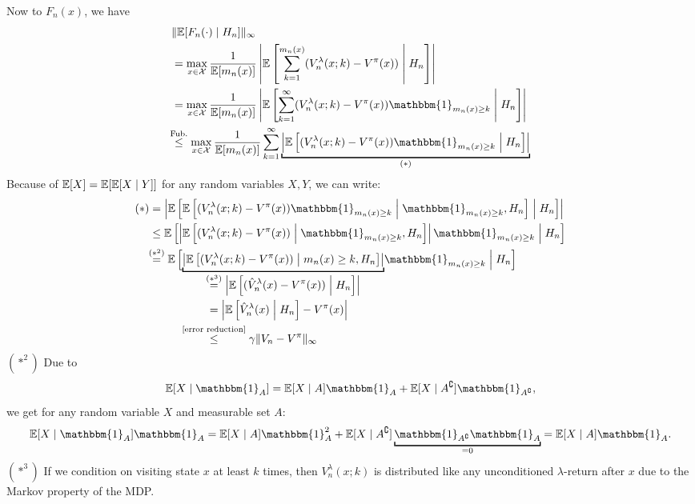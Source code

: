 Now to \(F_n(x)\), we have
\begin{align*}
    &\|\E[F_n(\cdot)\mid H_n]\|_\infty\\
    &= \max_{x\in\cX}\frac{1}{\E[m_n(x)]}
    \left| \E\left[\sum_{k=1}^{m_n(x)}(V_n^\lambda(x;k)-V^\pi(x)) \;\middle|\; H_n \right]\right| \\
    &= \max_{x\in\cX}\frac{1}{\E[m_n(x)]}
    \left| \E\left[\sum_{k=1}^\infty (V_n^\lambda(x;k)-V^\pi(x))\mathbbm{1}_{m_n(x)\ge k} \;\middle|\; H_n \right]\right|\\
    &\lxlq{\text{Fub.}} \max_{x\in\cX}\frac{1}{\E[m_n(x)]}
    \sum_{k=1}^\infty \underbracket[1pt]{\left| \E\left[ (V_n^\lambda(x;k)-V^\pi(x))\mathbbm{1}_{m_n(x)\ge k} \;\middle|\; H_n \right]\right|}_{
        (*)
    }
\end{align*}
Because of \(\mathbb{E}[X]=\mathbb{E}[\mathbb{E}[X\mid Y]]\) for any random variables \(X,Y\), we can write:
\begin{align*}
    (*)
    &=\left| \E\left[ \E\left[(V_n^\lambda(x;k)-V^\pi(x))\mathbbm{1}_{m_n(x)\ge k}\;\middle|\; \mathbbm{1}_{m_n(x)\ge k}, H_n \right] \;\middle|\; H_n \right]\right| \\
    &\le \E\left[ \left|\E\left[(V_n^\lambda(x;k)-V^\pi(x))\;\middle|\; \mathbbm{1}_{m_n(x)\ge k}, H_n \right]\right| \mathbbm{1}_{m_n(x)\ge k} \;\middle|\; H_n \right]\\
    &\lxeq{(*^2)}
    \vphantom{
        \E
        \underbracket[1pt]{\left|\E\left[(V_n^\lambda(x;k)-V^\pi(x))\;\middle|\; m_n(x)\ge k, H_n \right]\right|}_{
        \begin{aligned}
            &=\left| \E\left[(\hat{V}_n^\lambda(x)-V^\pi(x))\;\middle|\; H_n \right] \right|\\
            &=\left| \E\left[\hat{V}_n^\lambda(x)\;\middle|\; H_n \right]-V^\pi(x) \right|\\
            &\lxlq{\text{\ref{error reduction}}} \gamma \|V_n-V^\pi\|_\infty
        \end{aligned}
        }
    }
    \E\left[ \smash{
        \underbracket[1pt]{\left|\E\left[(V_n^\lambda(x;k)-V^\pi(x))\;\middle|\; m_n(x)\ge k, H_n \right]\right|}_{
        \begin{aligned}
        &\lxeq{(*^3)}\left| \E\left[(\hat{V}_n^\lambda(x)-V^\pi(x))\;\middle|\; H_n \right] \right|\\
        &=\left| \E\left[\hat{V}_n^\lambda(x)\;\middle|\; H_n \right]-V^\pi(x) \right|\\
        &\lxlq{\text{\ref{error reduction}}} \gamma \|V_n-V^\pi\|_\infty
        \end{aligned}
    }
    } \mathbbm{1}_{m_n(x)\ge k} \;\middle|\; H_n \right]
\end{align*}
\((*^2)\) Due to 
\[
    \E[X\mid \mathbbm{1}_A]=\E[X\mid A]\mathbbm{1}_A +\E[X\mid A^\complement]\mathbbm{1}_{A^\complement},
\]
we get for any random variable \(X\) and measurable set \(A\):
\[
    \E[X\mid \mathbbm{1}_A]\mathbbm{1}_A=\E[X\mid A]\mathbbm{1}_A^2 +\E[X\mid A^\complement]\underbracket[1pt]{\mathbbm{1}_{A^\complement}\mathbbm{1}_A}_{=0}=\E[X\mid A]\mathbbm{1}_A.
\]
\(({*^3})\) If we condition on visiting state \(x\) at least \(k\) times, then \(V_n^\lambda(x;k)\) is distributed like any unconditioned \(\lambda\)-return after \(x\) due to the Markov property of the MDP.

